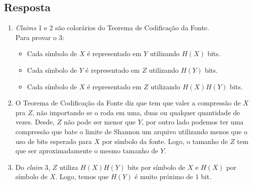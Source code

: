 \subsection*{Resposta}

\begin{enumerate}
\itemsep1em

    \item 
    \textit{Claims} 1 e 2 são colorários do Teorema de Codificação da Fonte. \\
    Para provar o 3: \\
    \begin{itemize}
        \item Cada símbolo de $X$ é representado em $Y$ utilizando $H(X)$ bits.
        \item Cada símbolo de $Y$ é representado em $Z$ utilizando $H(Y)$ bits.
        \item Cada símbolo de $X$ é representado em $Z$ utilizando $H(X)H(Y)$ bits.
    \end{itemize}
    
    
    \item
    O Teorema de Codificação da Fonte diz que tem que valer a compressão de $X$ pra $Z$, não importando se o roda em uma, duas ou qualquer quantidade de vezes. Desde, $Z$ não pode ser menor que $Y$, por outro lado podemos ter uma compressão que bate o limite de Shannon um arquivo utilizando menos que o uso de bits esperado para $X$ por símbolo da fonte. Logo, o tamanho de $Z$ tem que ser aproximadamente o mesmo tamanho de $Y$.
    
    \item 
    Do \textit{claim} 3, $Z$ utiliza $H(X)H(Y)$ bits por símbolo de $X$ e $H(X)$ por símbolo de $X$. Logo, temos que $H(Y)$ é muito próximo de $1$ bit.
    

\end{enumerate}
